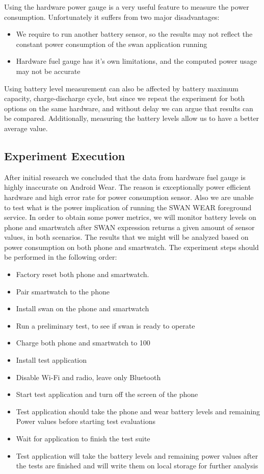  Using the hardware power gauge is a very useful feature to measure the power consumption. Unfortunately it suffers from two major disadvantages:
 \begin{itemize}
  \item We require to run another battery sensor, so the results may not reflect the constant power consumption of the swan application running
  \item Hardware fuel gauge has it's own limitations, and the computed power usage may not be accurate
 \end{itemize}

 Using battery level measurement can also be affected by battery maximum capacity, charge-discharge cycle, but since we repeat the experiment for both options on the same hardware, and without delay we can argue that results can be compared.
 Additionally, measuring the battery levels allow us to have a better average value.
 
 \subsection{Experiment Execution}
 After initial research we concluded that the data from hardware fuel gauge is highly inaccurate on Android Wear.
 The reason is exceptionally power efficient hardware and high error rate for power consumption sensor. 
 Also we are unable to test what is the power implication of running the SWAN WEAR foreground service. 
 In order to obtain some power metrics, we will monitor battery levels on phone and smartwatch after SWAN expression returns a given amount of sensor values, in both scenarios.
The results that we might will be analyzed based on power consumption on both phone and smartwatch.
The experiment steps should be performed in the following order:
\begin{itemize}
 \item Factory reset both phone and smartwatch.
 \item Pair smartwatch to the phone
 \item Install swan on the phone and smartwatch
 \item Run a preliminary test, to see if swan is ready to operate
 \item Charge both phone and smartwatch to 100%
 \item Install test application
 \item Disable Wi-Fi and radio, leave only Bluetooth
 \item Start test application and turn off the screen of the phone
 \item Test application should take the phone and wear battery levels and remaining Power values before starting test evaluations
 \item Wait for application to finish the test suite
 \item Test application will take the battery levels and remaining power values after the tests are finished and will write them on local storage for further analysis
\end{itemize}

